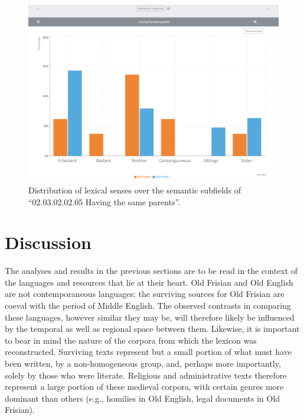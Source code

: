 \begin{figure}[htbp]
	\includegraphics[width=\textwidth]{Stolk2021b/fig/Fig9.png}
	\caption[]{\label{fig:Stolk2021b:Fig9} Distribution of lexical senses over the semantic subfields of “02.03.02.02.05 Having the same parents”.}
\end{figure}


\section{Discussion}
\label{sect:Stolk2021b:Discussion}

The analyses and results in the previous sections are to be read in the context of the languages and resources that lie at their heart. Old Frisian and Old English are not contemporaneous languages: the surviving sources for Old Frisian are coeval with the period of Middle English. The observed contrasts in comparing these languages, however similar they may be, will therefore likely be influenced by the temporal as well as regional space between them. Likewise, it is important to bear in mind the nature of the corpora from which the lexicon was reconstructed. Surviving texts represent but a small portion of what must have been written, by a non-homogeneous group, and, perhaps more importantly, solely by those who were literate. Religious and administrative texts therefore represent a large portion of these medieval corpora, with certain genres more dominant than others (e.g., homilies in Old English, legal documents in Old Frisian).

